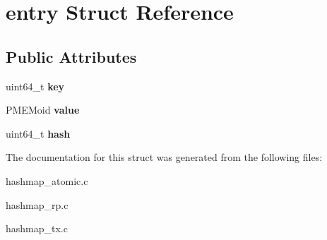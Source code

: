 \hypertarget{structentry}{}\section{entry Struct Reference}
\label{structentry}
\subsection*{Public Attributes}
\begin{DoxyCompactItemize}
\item 
uint64\+\_\+t {\bfseries key}\hypertarget{structentry_a9baabf5b8c35d0a925340cd73e23ae8d}{}\label{structentry_a9baabf5b8c35d0a925340cd73e23ae8d}

\item 
P\+M\+E\+Moid {\bfseries value}\hypertarget{structentry_abc6a75d6690199042034e9300aebd4c1}{}\label{structentry_abc6a75d6690199042034e9300aebd4c1}

\item 
uint64\+\_\+t {\bfseries hash}\hypertarget{structentry_a97cd1dbcdcea14e94f70a86a391b662b}{}\label{structentry_a97cd1dbcdcea14e94f70a86a391b662b}

\end{DoxyCompactItemize}


The documentation for this struct was generated from the following files\+:\begin{DoxyCompactItemize}
\item 
hashmap\+\_\+atomic.\+c\item 
hashmap\+\_\+rp.\+c\item 
hashmap\+\_\+tx.\+c\end{DoxyCompactItemize}
